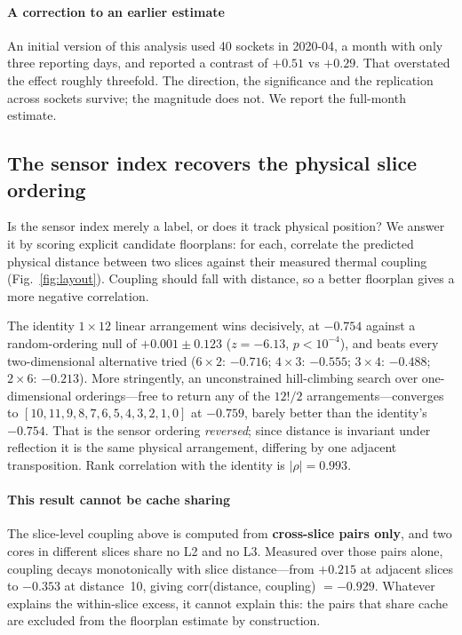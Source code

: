 \documentclass[10pt,conference]{IEEEtran}
\begin{document}
\paragraph*{A correction to an earlier estimate} An initial version of this analysis used 40
sockets in 2020-04, a month with only three reporting days, and reported a contrast of
$+0.51$ vs $+0.29$. That overstated the effect roughly threefold. The direction, the significance
and the replication across sockets survive; the magnitude does not. We report the full-month
estimate.

\subsection{The sensor index recovers the physical slice ordering}
\label{sec:layout}
Is the sensor index merely a label, or does it track physical position? We answer it by scoring
explicit candidate floorplans: for each, correlate the predicted physical distance between two
slices against their measured thermal coupling (Fig.~\ref{fig:layout}). Coupling should fall with
distance, so a better floorplan gives a more negative correlation.

The identity $1\times12$ linear arrangement wins decisively, at $-0.754$ against a
random-ordering null of $+0.001\pm0.123$ ($z=-6.13$, $p<10^{-4}$), and beats every two-dimensional
alternative tried ($6\times2$: $-0.716$; $4\times3$: $-0.555$; $3\times4$: $-0.488$; $2\times6$:
$-0.213$). More stringently, an unconstrained hill-climbing search over one-dimensional
orderings---free to return any of the $12!/2$ arrangements---converges to
$[10,11,9,8,7,6,5,4,3,2,1,0]$ at $-0.759$, barely better than the identity's $-0.754$. That is the
sensor ordering \emph{reversed}; since distance is invariant under reflection it is the same
physical arrangement, differing by one adjacent transposition. Rank correlation with the identity
is $|\rho|=0.993$.

\paragraph*{This result cannot be cache sharing} The slice-level coupling above is computed from
\textbf{cross-slice pairs only}, and two cores in different slices share no L2 and no L3. Measured
over those pairs alone, coupling decays monotonically with slice distance---from $+0.215$ at
adjacent slices to $-0.353$ at distance~10, giving corr(distance, coupling) $=-0.929$. Whatever
explains the within-slice excess, it cannot explain this: the pairs that share cache are excluded
from the floorplan estimate by construction.
\end{document}
